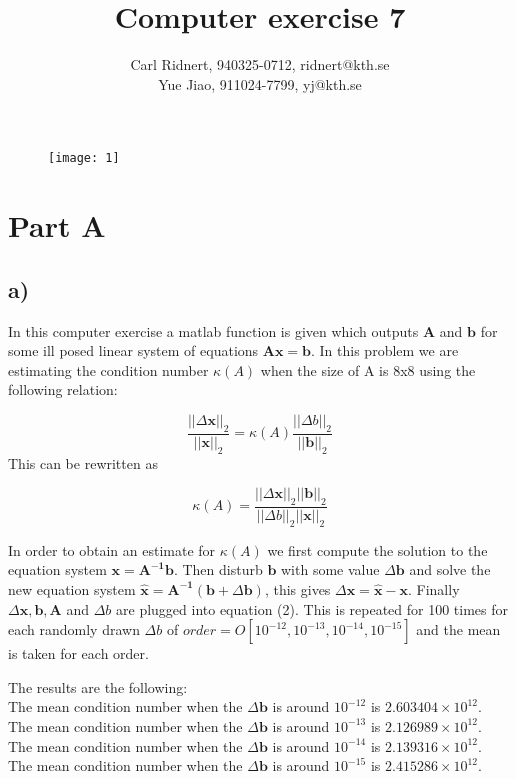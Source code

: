 \documentclass[11pt,a4paper,roman]{scrartcl}
\title{Computer exercise 7}
\date{}
\author{Carl Ridnert, 940325-0712, ridnert@kth.se \\
Yue Jiao, 911024-7799, yj@kth.se}
\begin{document}
\maketitle
\begin{figure}[h]
\centering
\texttt{[image: 1]}
\end{figure}


\newpage

\section*{Part A}

\subsection*{a)}

In this computer exercise a matlab function is given which outputs $\boldsymbol{A}$ and $\boldsymbol{b}$ for some ill posed linear system of equations $\boldsymbol{Ax}=\boldsymbol{b}$.
In this problem we are estimating the condition number $\kappa (A)$ when the size of A is 8x8 using the following relation:

\begin{equation}
\frac{||\Delta \boldsymbol{x}||_2}{||\boldsymbol{x}||_2}=\kappa(A)\frac{||\Delta b||_2}{||\boldsymbol{b}||_2}
\end{equation}
This can be rewritten as

\begin{equation}
\kappa(A)=\frac{||\Delta \boldsymbol{x}||_2||\boldsymbol{b}||_2}{||\Delta b||_2 ||\boldsymbol{x}||_2}
\end{equation}

In order to obtain an estimate for $\kappa(A)$ we first compute the solution to the equation system $\boldsymbol{x}=\boldsymbol{A^{-1}}\boldsymbol{b}$. Then disturb $\boldsymbol{b}$ with some value $\Delta \boldsymbol{b}$ and solve the new equation system $\hat{\boldsymbol{x}}=\boldsymbol{A^{-1}}(\boldsymbol{b}+\Delta \boldsymbol{b})$, this gives $\Delta \boldsymbol{x}=\hat{\boldsymbol{x}}-\boldsymbol{x}$. Finally $\Delta \boldsymbol{x}, \boldsymbol{b},\boldsymbol{A}$ and $\Delta b$ are plugged into equation (2). This is repeated for 100 times for each randomly drawn $\Delta b$ of $order=O[10^{-12},10^{-13},10^{-14},10^{-15}]$ and the mean is taken for each order.

The results are the following: \\
The mean condition number when the $\Delta \boldsymbol{b}$ is around $10^{-12}$ is $2.603404\times 10^{12}$. \\
The mean condition number when the $\Delta \boldsymbol{b}$ is around $10^{-13}$ is $2.126989\times 10^{12}$. \\
The mean condition number when the $\Delta \boldsymbol{b}$ is around $10^{-14}$ is $2.139316\times 10^{12}$. \\
The mean condition number when the $\Delta \boldsymbol{b}$ is around $10^{-15}$ is $2.415286\times 10^{12}$. \\
\end{document}
